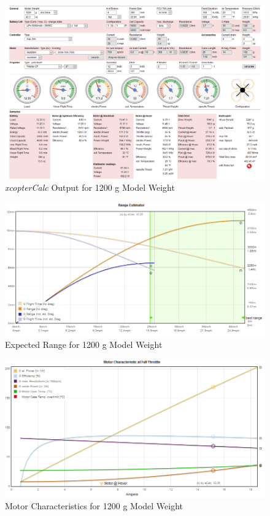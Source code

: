 \begin{figure}[H]
\centering
\includegraphics[width=16.5cm]{img/1200g_sim.png}
\caption{\textit{xcopterCalc} Output for 1200 g Model Weight}
\end{figure} 

\begin{figure}[H]
\centering
\includegraphics[width=16.5cm]{img/1200g_range.png}
\caption{Expected Range for 1200 g Model Weight}
\end{figure} 

\begin{figure}[H]
\centering
\includegraphics[width=16.5cm]{img/1200g_motor.png}
\caption{Motor Characteristics for 1200 g Model Weight}
\end{figure} 

